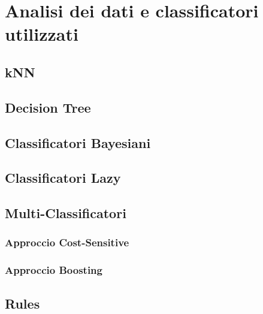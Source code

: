 \section{Analisi dei dati e classificatori utilizzati}
\subsection{kNN}
\subsection{Decision Tree}
\subsection{Classificatori Bayesiani}
\subsection{Classificatori Lazy}
\subsection{Multi-Classificatori}
\subsubsection{Approccio Cost-Sensitive}
\subsubsection{Approccio Boosting}
\subsection{Rules}
